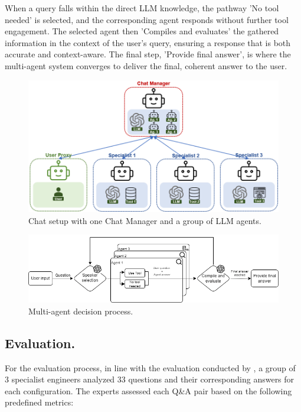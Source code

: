             
            When a query falls within the direct LLM knowledge, the pathway 'No tool needed' is selected, and the corresponding agent responds without further tool engagement.
            The selected agent then 'Compiles and evaluates' the gathered information in the context of the user's query, ensuring a response that is both accurate and context-aware. The final step, 'Provide final answer', is where the multi-agent system converges to deliver the final, coherent answer to the user.
                
            \begin{figure}[h]
                \centering
                \includegraphics[width=.75\textwidth]{images/agent_config_2.png}
                \caption{Chat setup with one Chat Manager and a group of LLM agents.}
                \label{fig:agent_config_2}
            \end{figure}
            
            
            \begin{figure}[h]
                \centering
                \includegraphics[width=1\textwidth]{images/agent_diagram_2.png}
                \caption{Multi-agent decision process.}
                \label{fig:diagrama_agente_MultiAgente_2}
            \end{figure}

            
        \subsection{Evaluation.}             

            For the evaluation process, in line with the evaluation conducted by \citep{Li2023}, a group of 3 specialist engineers analyzed 33 questions and their corresponding answers for each configuration. 
            The experts assessed each Q\&A pair based on the following predefined metrics:

